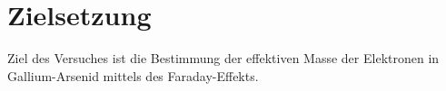 \section{Zielsetzung}
\label{sec:Zielsetzung}

Ziel des Versuches ist die Bestimmung der effektiven Masse der Elektronen in Gallium-Arsenid mittels des Faraday-Effekts.
